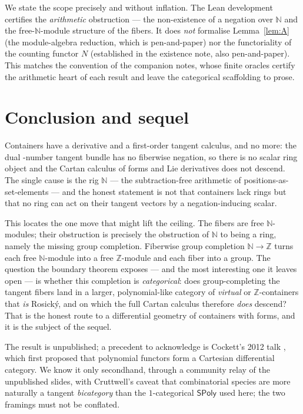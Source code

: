 \documentclass[11pt]{article}
\theoremstyle{definition}
\newcommand{\SPoly}{\mathsf{SPoly}}
\newcommand{\N}{\mathbb{N}}
\newcommand{\Z}{\mathbb{Z}}
\begin{document}
We state the scope precisely and without inflation. The Lean development certifies the
\emph{arithmetic} obstruction --- the non-existence of a negation over $\N$ and the
free-$\N$-module structure of the fibers. It does \emph{not} formalise Lemma~\ref{lem:A}
(the module-algebra reduction, which is pen-and-paper) nor the functoriality of the
counting functor $N$ (established in the existence note, also pen-and-paper). This matches
the convention of the companion notes, whose finite oracles certify the arithmetic heart of
each result and leave the categorical scaffolding to prose.

\section{Conclusion and sequel}\label{sec:conclusion}

Containers have a derivative and a first-order tangent calculus, and no more: the dual
-number tangent bundle has no fiberwise negation, so there is no scalar ring object and the
Cartan calculus of forms and Lie derivatives does not descend. The single cause is the rig
$\N$ --- the subtraction-free arithmetic of positions-as-set-elements --- and the honest
statement is not that containers lack rings but that no ring can act on their tangent
vectors by a negation-inducing scalar.

This locates the one move that might lift the ceiling. The fibers are free $\N$-modules;
their obstruction is precisely the obstruction of $\N$ to being a ring, namely the missing
group completion. Fiberwise group completion $\N\to\Z$ turns each free $\N$-module into a
free $\Z$-module and each fiber into a group. The question the boundary theorem exposes ---
and the most interesting one it leaves open --- is whether this completion is
\emph{categorical}: does group-completing the tangent fibers land in a larger,
polynomial-like category of \emph{virtual} or $\Z$-containers that \emph{is} Rosick\'y, and
on which the full Cartan calculus therefore \emph{does} descend? That is the honest route to
a differential geometry of containers with forms, and it is the subject of the sequel.

The result is unpublished; a precedent to acknowledge is Cockett's 2012 talk
\cite{Cockett2012}, which first proposed that polynomial functors form a Cartesian
differential category. We know it only secondhand, through a community relay of the
unpublished slides, with Cruttwell's caveat that combinatorial species are more naturally a
tangent \emph{bicategory} than the $1$-categorical $\SPoly$ used here; the two framings must
not be conflated.
\end{document}
